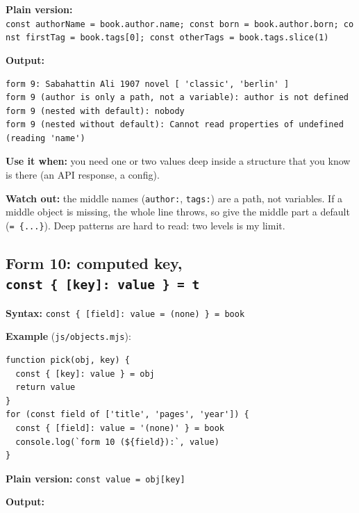 \documentclass[
  10pt,
]{article}
\begin{document}
\textbf{Plain version:}
\texttt{const\ authorName\ =\ book.\allowbreak{}author.\allowbreak{}name;\ const\ born\ =\ book.\allowbreak{}author.\allowbreak{}born;\ const\ firstTag\ =\ book.\allowbreak{}tags{[}0{]\allowbreak{}};\ const\ otherTags\ =\ book.\allowbreak{}tags.\allowbreak{}slice(1)}

\textbf{Output:}

\begin{verbatim}
form 9: Sabahattin Ali 1907 novel [ 'classic', 'berlin' ]
form 9 (author is only a path, not a variable): author is not defined
form 9 (nested with default): nobody
form 9 (nested without default): Cannot read properties of undefined (reading 'name')
\end{verbatim}

\textbf{Use it when:} you need one or two values deep inside a structure
that you know is there (an API response, a config).

\textbf{Watch out:} the middle names (\texttt{author:}, \texttt{tags:})
are a path, not variables. If a middle object is missing, the whole line
throws, so give the middle part a default
(\texttt{=\ \{.\allowbreak{}.\allowbreak{}.\allowbreak{}\}}). Deep
patterns are hard to read: two levels is my limit.

\hypertarget{form-10-computed-key-const--key-value---t}{%
\subsection{\texorpdfstring{Form 10: computed key,
\texttt{const\ \{\ {[}key{]\allowbreak{}}:\ value\ \}\ =\ t}}{Form 10: computed key, }}\label{form-10-computed-key-const--key-value---t}}

\textbf{Syntax:}
\texttt{const\ \{\ {[}field{]\allowbreak{}}:\ value\ =\ \allowbreak{}\textquotesingle{}(none)\allowbreak{}\textquotesingle{}\ \}\ =\ book}

\textbf{Example} (\texttt{js/\allowbreak{}objects.\allowbreak{}mjs}):

\begin{verbatim}
function pick(obj, key) {
  const { [key]: value } = obj
  return value
}
for (const field of ['title', 'pages', 'year']) {
  const { [field]: value = '(none)' } = book
  console.log(`form 10 (${field}):`, value)
}
\end{verbatim}

\textbf{Plain version:}
\texttt{const\ value\ =\ obj{[}key{]\allowbreak{}}}

\textbf{Output:}
\end{document}
